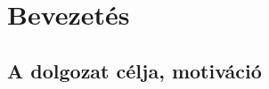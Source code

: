 \documentclass[twoside, a4paper, 12pt]{article}
\title{\CIM}
\author{\SZERZO}
\date{\VEDESEVE}
\begin{document}
\pagestyle{empty}


\cleardoublepage


\tableofcontents
\cleardoublepage

\pagestyle{plain}
\setcounter{page}{1}



\section{Bevezetés}

\subsection{A dolgozat célja, motiváció}
\end{document}

